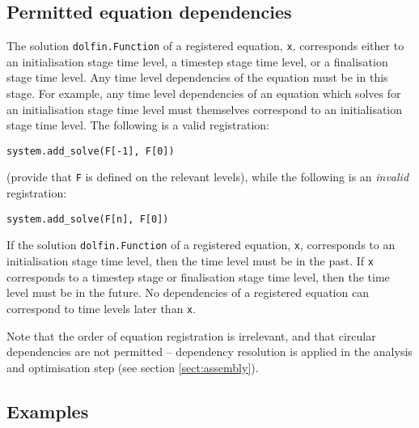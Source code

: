 \documentclass[a4paper]{book}
\begin{document}
\subsection{Permitted equation dependencies}

The solution \verb+dolfin.Function+ of a registered equation, \verb+x+,
corresponds either to an initialisation stage time level, a timestep stage time
level, or a finalisation stage time level. Any time level dependencies of the
equation must be in this stage. For example, any time level dependencies of an
equation which solves for an initialisation stage time level must themselves
correspond to an initialisation stage time level. The following is a valid
registration:
\begin{lstlisting}
system.add_solve(F[-1], F[0])
\end{lstlisting}
(provide that \verb+F+ is defined on the relevant levels), while the following
is an \emph{invalid} registration:
\begin{lstlisting}
system.add_solve(F[n], F[0])
\end{lstlisting}

If the solution \verb+dolfin.Function+ of a registered equation, \verb+x+,
corresponds to an initialisation stage time level, then the time level must be
in the past. If \verb+x+ corresponds to a timestep stage or finalisation stage
time level, then the time level must be in the future. No dependencies of a
registered equation can correspond to time levels later than \verb+x+.

Note that the order of equation registration is irrelevant, and that
circular dependencies are not permitted -- dependency resolution is applied in
the analysis and optimisation step (see section \ref{sect:assembly}).

\subsection*{Examples}
\end{document}
